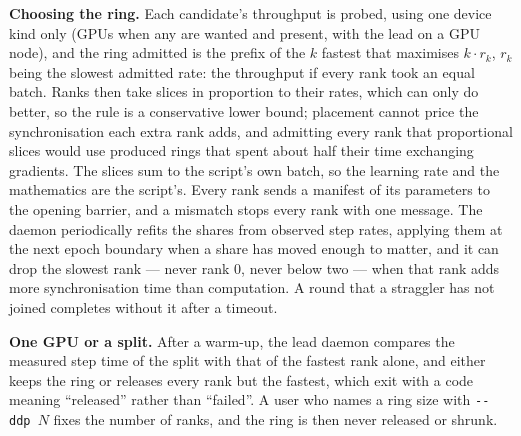 \textbf{Choosing the ring.} Each candidate's throughput is probed, using one
device kind only (GPUs when any are wanted and present, with the lead on a GPU
node), and the ring admitted is the prefix of the $k$ fastest that maximises
$k \cdot r_k$, $r_k$ being the slowest admitted rate: the throughput if every
rank took an equal batch. Ranks then take slices in proportion to their rates,
which can only do better, so the rule is a conservative lower bound; placement
cannot price the synchronisation each extra rank adds, and admitting every rank
that proportional slices would use produced rings that spent about half their
time exchanging gradients. The slices sum to the script's own batch, so the
learning rate and the mathematics are the script's.
Every rank sends a manifest of its parameters to the opening barrier, and a
mismatch stops every rank with one message. The daemon periodically refits
the shares from observed step rates, applying them at the next epoch boundary
when a share has moved enough to matter, and it can drop the slowest
rank --- never rank 0, never below two --- when that rank adds more
synchronisation time than computation. A round that a straggler has not joined
completes without it after a timeout.

\textbf{One GPU or a split.} After a warm-up, the lead daemon compares the
measured step time of the split with that of the fastest rank alone, and either
keeps the ring or releases every rank but the fastest, which exit with a code
meaning ``released'' rather than ``failed''. A user who names a ring size with
\texttt{-{}-ddp~$N$} fixes the number of ranks, and the ring is then never
released or shrunk.

